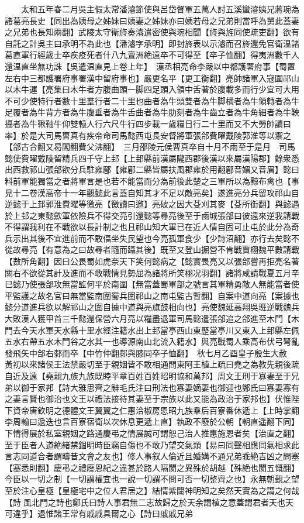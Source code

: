 　　太和五年春二月吳主假太常潘濬節使與呂岱督軍五萬人討五溪蠻濬姨兄蔣琬為諸葛亮長史【同出為姨母之姊妹曰姨妻之姊妹亦曰姨若母之兄弟則當呼為舅此蓋妻之兄弟也長知兩翻】武陵太守衛旍奏濬遣密使與琬相聞【旍與旌同使疏吏翻】欲有自託之計吳主曰承明不為此也【潘濬字承明】即封旍表以示濬而召旍還免官衛温諸葛直軍行經歲士卒疾疫死者什八九亶洲絶遠卒不可得至【卒子恤翻】得夷洲數千人還温直坐無功誅【吳遣温直見上卷上年】　漢丞相亮命李嚴以中都護署府事【蜀置左右中三都護署府事署漢中留府事也】嚴更名平【更工衡翻】亮帥諸軍入寇圍祁山以木牛運【亮集曰木牛者方腹曲頭一脚四足頭入領中舌著於腹載多而行少宜可大用不可少使特行者數十里羣行者二十里也曲者為牛頭雙者為牛脚横者為牛領轉者為牛足覆者為牛背方者為牛腹垂者為牛舌曲者為牛肋刻者為牛齒立者為牛角細者為牛鞅攝者為牛鞦䩜牛仰雙轅人行六尺牛行四步載一歲糧日行二十里而又不大勞帥讀曰率】於是大司馬曹真有疾帝命司馬懿西屯長安督將軍張郃費曜戴陵郭淮等以禦之【郃古合翻又曷閣翻費父沸翻】　三月邵陵元侯曹真卒自十月不雨至于是月　司馬懿使費曜戴陵留精兵四千守上邽【上邽縣前漢屬隴西郡後漢以來屬漢陽郡】餘衆悉出西救祁山張郃欲分兵駐雍郿【雍郿二縣皆屬扶風郡雍於用翻郿音媚又音眉】懿曰料前軍能獨當之者將軍言是也若不能當而分為前後此楚之三軍所以為黥布禽也【事見十二卷漢高帝十一年觀懿此言蓋自知其才不足以敵亮矣】遂進亮分兵留攻祁山自逆懿于上邽郭淮費曜等徼亮【徼讀曰邀】亮破之因大芟刈其麥【芟所衘翻】與懿遇於上邽之東懿歛軍依險兵不得交亮引還懿等尋亮後至于鹵城張郃曰彼遠來逆我請戰不得謂我利在不戰欲以長計制之也且祁山知大軍已在近人情自固可止屯於此分為奇兵示出其後不宜進前而不敢偪坐失民望也今亮孤軍食少【少詩沼翻】亦行去矣懿不從故尋亮【有意為之曰故尋者隨而躡其後】既至又登山掘營不肯戰賈栩魏平數請戰【數所角翻】因曰公畏蜀如虎奈天下笑何懿病之【懿實畏亮又以張郃嘗再拒亮名著關右不欲從其計及進而不敢戰情見勢屈為諸將所笑栩况羽翻】諸將咸請戰夏五月辛巳懿乃使張郃攻無當監何平於南圍【無當蓋蜀軍部之號言其軍精勇敵人無能當者使平監護之故名官曰無當監南圍蜀兵圍祁山之南屯監古暫翻】自案中道向亮【案據也懿分道進兵欲以解祁山之圍自據中道與亮旗鼓相向也】亮使魏延高翔吳班逆戰魏兵大敗漢人獲甲首三千懿還保營六月亮以糧盡退軍司馬懿遣張郃追之郃進至木門【木門去今天水軍天水縣十里水經注籍水出上邽當亭西山東歷當亭川又東入上邽縣左佩五水右帶五水木門谷之水其一也導源南山北流入籍水】與亮戰蜀人乘高布伏弓弩亂發飛矢中郃右䣛而卒【中竹仲翻䣛與膝同卒子恤翻】　秋七月乙酉皇子殷生大赦　黃初以來諸侯王法禁嚴切至于親姻皆不敢相通問東阿王植上疏曰堯之為教先親後疏自近及遠【堯親九族九族既睦平章百姓百姓昭明協和萬邦】周文王刑于寡妻至于兄弟以御于家邦【詩大雅思齊之辭毛氏注曰刑法也寡妻嫡妻也御迎也鄭氏曰寡妻寡有之妻言賢也御治也文王以禮法接待其妻至于宗族以此又能為政治于家邦也】伏惟陛下資帝唐欽明之德體文王翼翼之仁惠洽椒房恩昭九族羣后百寮番休遞上【上時掌翻李周翰曰遞迭也言百寮宿衛以次休息更遞上直】執政不廢於公朝【朝直遥翻下同】下情得展於私室親姻之路通慶弔之情展誠可謂恕己治人推惠施恩者矣【治直之翻】至于臣者人道絶緒禁錮明時臣竊自傷也不敢乃望交氣類【易曰同聲相應同氣相求此言志同道合者謂疇昔文會之友也】修人事叙人倫近且婚媾不通兄弟乖絶吉凶之問塞【塞悉則翻】慶弔之禮廢恩紀之違甚於路人隔閡之異殊於胡越【殊絶也閡五慨翻】今臣以一切之制【一切謂權宜也一說一切謂不問可否一切整齊之也】永無朝覲之望至於注心皇極【皇極宅中之位人君居之】結情紫闥神明知之矣然天實為之謂之何哉【詩風北門之詩也鄭氏曰詩人事君無二志故歸之於天余謂植之意蓋謂君者天也天可違乎】退惟諸王常有戚戚具爾之心【詩曰戚戚兄弟
